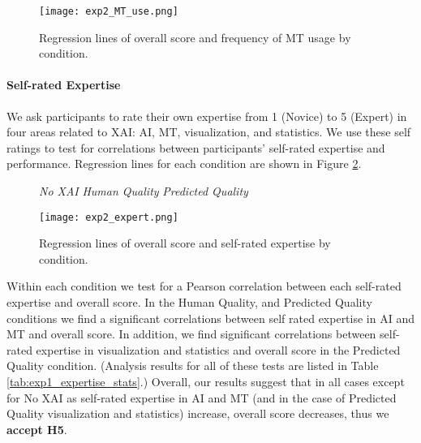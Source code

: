 \begin{figure}[h!]
    \centering
    \texttt{[image: exp2\_MT\_use.png]}
    \caption{Regression lines of overall score and frequency of MT usage by condition.}
    \label{fig:exp_MT_use}
\end{figure}

\paragraph{Self-rated Expertise}

We ask participants to rate their own expertise from 1 (Novice) to 5 (Expert) in four areas related to XAI: AI, MT, visualization, and statistics. We use these self ratings to test for correlations between participants’ self-rated expertise and performance. Regression lines for each condition are shown in Figure \ref{fig:exp_expert}.  

\begin{figure}[h!]
    \centering
    
     \textit{No XAI} \quad
     \textit{Human Quality} \quad
     \textit{Predicted Quality} \quad
    
    \texttt{[image: exp2\_expert.png]}
    \caption{Regression lines of overall score and self-rated expertise by condition.}
    \label{fig:exp_expert}
\end{figure}

Within each condition we test for a Pearson correlation between each self-rated expertise and overall score. In the Human Quality, and Predicted Quality conditions we find a significant correlations between self rated expertise in AI and MT and overall score. In addition, we find significant correlations between self-rated expertise in visualization and statistics and overall score in the Predicted Quality condition.  
(Analysis results for all of these tests are listed in Table \ref{tab:exp1_expertise_stats}.) Overall, our results suggest that in all cases except for No XAI as self-rated expertise in AI and MT (and in the case of Predicted Quality visualization and statistics) increase, overall score decreases, thus we \textbf{accept H5}.

